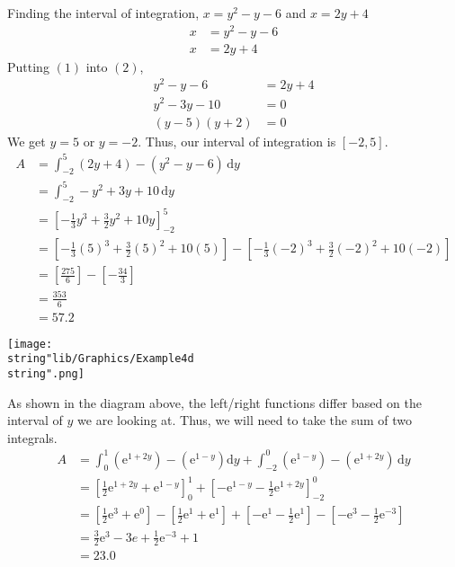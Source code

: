 \documentclass[11pt,a4paper]{book}
\begin{document}
\begin{example}
\begin{tasks}[label=(\alph*),label-width=3.5ex]
\task Finding the interval of integration, $x=y^{2}-y-6$ and $x=2y+4$
\begin{align*}
x & =y^{2}-y-6\tag{1}\\
x & =2y+4\tag{2}
\end{align*}
Putting $(1)$ into $(2)$,
\begin{align*}
y^{2}-y-6 & =2y+4\\
y^{2}-3y-10 & =0\\
(y-5)(y+2) & =0
\end{align*}
We get $y=5$ or $y=-2$. Thus, our interval of integration is $[-2,5]$.
\begin{align*}
A & =\int_{-2}^{5}(2y+4)-(y^{2}-y-6)\,\mathrm{d}y\\
 & =\int_{-2}^{5}-y^{2}+3y+10\,\mathrm{d}y\\
 & =\left[-\frac{1}{3}y^{3}+\frac{3}{2}y^{2}+10y\right]_{-2}^{5}\\
 & =\left[-\frac{1}{3}(5)^{3}+\frac{3}{2}(5)^{2}+10(5)\right]-\left[-\frac{1}{3}(-2)^{3}+\frac{3}{2}(-2)^{2}+10(-2)\right]\\
 & =\left[\frac{275}{6}\right]-\left[-\frac{34}{3}\right]\\
 & =\frac{353}{6}\\
 & =57.2
\end{align*}

\task \texttt{[image: \\string"lib/Graphics/Example4d\\string".png]}

As shown in the diagram above, the left/right functions differ based
on the interval of $y$ we are looking at. Thus, we will need to take
the sum of two integrals.
\begin{align*}
A & =\int_{0}^{1}\left(\mathrm{e}^{1+2y}\right)-\left(\mathrm{e}^{1-y}\right)\mathrm{d}y+\int_{-2}^{0}\left(\mathrm{e}^{1-y}\right)-\left(\mathrm{e}^{1+2y}\right)\,\mathrm{d}y\\
 & =\left[\frac{1}{2}\mathrm{e}^{1+2y}+\mathrm{e}^{1-y}\right]_{0}^{1}+\left[-\mathrm{e}^{1-y}-\frac{1}{2}\mathrm{e}^{1+2y}\right]_{-2}^{0}\\
 & =\left[\frac{1}{2}\mathrm{e}^{3}+\mathrm{e}^{0}\right]-\left[\frac{1}{2}\mathrm{e}^{1}+\mathrm{e}^{1}\right]+\left[-\mathrm{e}^{1}-\frac{1}{2}\mathrm{e}^{1}\right]-\left[-\mathrm{e}^{3}-\frac{1}{2}\mathrm{e}^{-3}\right]\\
 & =\frac{3}{2}\mathrm{e}^{3}-3e+\frac{1}{2}\mathrm{e}^{-3}+1\\
 & =23.0
\end{align*}

\end{tasks}

\end{example}
\end{document}
